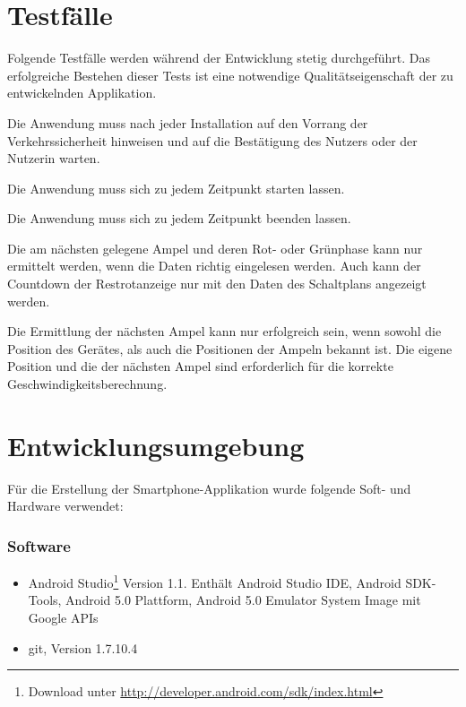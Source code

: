 \section{Testfälle}
Folgende Testfälle werden während der Entwicklung stetig durchgeführt. Das erfolgreiche Bestehen dieser Tests ist eine notwendige Qualitätseigenschaft der zu entwickelnden Applikation.
\begin{description}[leftmargin=0.7cm,style=nextline]
\item[Sicherheitshinweis:] 
Die Anwendung muss nach jeder Installation auf den Vorrang der Verkehrssicherheit hinweisen und auf die Bestätigung des Nutzers oder der Nutzerin warten.\\
\item[Anwendung starten:] 
Die Anwendung muss sich zu jedem Zeitpunkt starten lassen. \\
\item[Anwendung beenden:] 
Die Anwendung muss sich zu jedem Zeitpunkt beenden lassen. \\
\item[Einlesen der Datei:] 
Die am nächsten gelegene Ampel und deren Rot- oder Grünphase kann nur ermittelt werden, wenn die Daten richtig eingelesen werden. Auch kann der Countdown der Restrotanzeige nur mit den Daten des Schaltplans angezeigt werden.\\
\item[Ermittlung der Position:] 
Die Ermittlung der nächsten Ampel kann nur erfolgreich sein, wenn sowohl die Position des Gerätes, als auch die Positionen der Ampeln bekannt ist. Die eigene Position und die der nächsten Ampel sind erforderlich für die korrekte Geschwindigkeitsberechnung.\\
\end{description}
\section{Entwicklungsumgebung}
Für die Erstellung der Smartphone-Applikation wurde folgende Soft- und Hardware verwendet:
\subsubsection{Software}
\begin{itemize}
	\item Android Studio\footnote{ Download unter \url{http://developer.android.com/sdk/index.html}} Version 1.1. Enthält Android Studio IDE, Android \gls{SDK}-Tools, Android 5.0 Plattform, Android 5.0 Emulator System Image mit Google \glspl{API}
	\item git, Version 1.7.10.4
\end{itemize}
